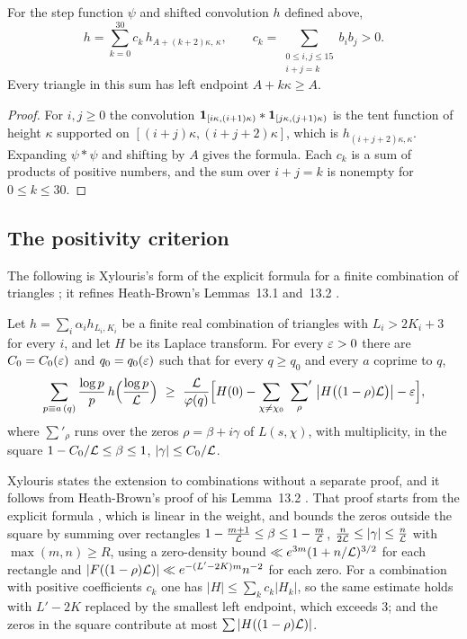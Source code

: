 \begin{lemma}\label{lem:triangles}
For the step function $\psi$ and shifted convolution $h$ defined above,
\[
  h=\sum_{k=0}^{30}c_k\,h_{A+(k+2)\kappa,\,\kappa},\qquad
  c_k=\sum_{\substack{0\le i,j\le15\\ i+j=k}}b_ib_j>0 .
\]
Every triangle in this sum has left endpoint $A+k\kappa\ge A$.
\end{lemma}

\begin{proof}
For $i,j\ge0$ the convolution $\mathbf{1}_{[i\kappa,(i+1)\kappa)}*\mathbf{1}_{[j\kappa,(j+1)\kappa)}$ is the tent
function of height $\kappa$ supported on $[(i+j)\kappa,(i+j+2)\kappa]$, which is
$h_{(i+j+2)\kappa,\kappa}$. Expanding $\psi*\psi$ and shifting by $A$ gives the formula. Each
$c_k$ is a sum of products of positive numbers, and the sum over $i+j=k$ is nonempty for
$0\le k\le30$.
\end{proof}

\subsection{The positivity criterion}
The following is Xylouris's form of the explicit formula for a finite combination of triangles
\cite[(3.56)--(3.58) and the lines between (3.56) and (3.57), pp.~34--35]{Xylouris2011nullstellen}; it
refines Heath-Brown's Lemmas~13.1 and~13.2 \cite{HeathBrown1992zero}.

\begin{inp}\label{inp:criterion}
Let $h=\sum_i\alpha_ih_{L_i,K_i}$ be a finite real combination of triangles with
$L_i>2K_i+3$ for every $i$, and let $H$ be its Laplace transform. For every $\varepsilon>0$ there are
$C_0=C_0(\varepsilon)$ and $q_0=q_0(\varepsilon)$ such that for every $q\ge q_0$ and every $a$ coprime to $q$,
\[
  \sum_{p\equiv a\,(q)}\frac{\log p}{p}\,h\Bigl(\frac{\log p}{\LL}\Bigr)\ \ge\
  \frac{\LL}{\varphi(q)}\Bigl[H(0)-\sum_{\chi\ne\chi_0}\ {\sum_\rho}'\ \bigl|H\bigl((1-\rho)\LL\bigr)\bigr|
  -\eps\Bigr],
\]
where $\sum'_\rho$ runs over the zeros $\rho=\beta+i\gamma$ of $L(s,\chi)$, with multiplicity, in the
square $1-C_0/\mathcal{L}\le\beta\le1$, $|\gamma|\le C_0/\mathcal{L}$.
\end{inp}

Xylouris states the extension to combinations without a separate proof, and it follows from
Heath-Brown's proof of his Lemma~13.2 \cite[\S13]{HeathBrown1992zero}. That proof starts from the explicit
formula \cite[Lemma~13.1]{HeathBrown1992zero}, which is linear in the weight, and bounds the zeros
outside the square by summing over rectangles $1-\frac{m+1}{\mathcal{L}}\le\beta\le1-\frac m{\mathcal{L}}$,
$\frac n{2\mathcal{L}}\le|\gamma|\le\frac n{\mathcal{L}}$ with $\max(m,n)\ge R$, using a zero-density bound $\ll e^{3m}(1+n/\mathcal{L})^{3/2}$
for each rectangle and $|F((1-\rho)\mathcal{L})|\ll e^{-(L'-2K)m}n^{-2}$ for each zero. For a combination with positive
coefficients $c_k$ one has $|H|\le\sum_kc_k|H_k|$, so the same estimate holds with $L'-2K$ replaced by the
smallest left endpoint, which exceeds $3$; and the zeros in the square contribute at most
$\sum|H((1-\rho)\mathcal{L})|$.

